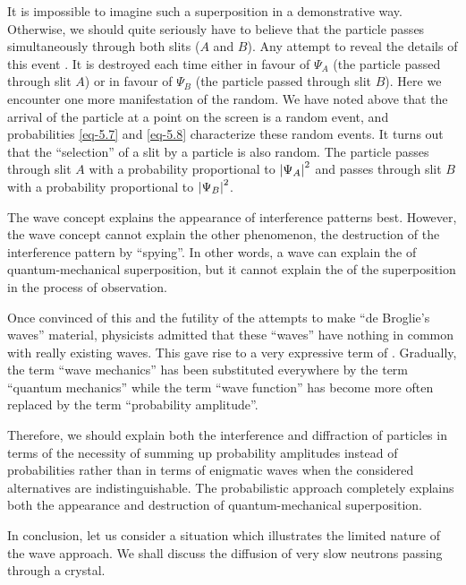 It is impossible to imagine such a superposition in a demonstrative
way. Otherwise, we should quite seriously have to believe that the
particle passes simultaneously through both slits ($A$ and $B$). Any attempt
to reveal the details of this event . It is
destroyed each time either in favour of $ \Psi_{A}$ (the particle passed through slit $A$) or in favour of $ \Psi_{B} $ (the particle passed through slit $B$). Here we encounter one more manifestation of the random. We have
noted above that the arrival of the particle at a point on the screen is
a random event, and probabilities \eqref{eq-5.7} and \eqref{eq-5.8} characterize these random events. It turns out that the ``selection'' of a slit by a particle is also random. The particle passes through slit $A$ with a probability proportional to  $ \abs{\Psi_{A}}^{2}$ and passes through slit $B$ with a probability proportional to $ \abs{\Psi_{B}}^{2}$.

 The wave concept
explains the appearance of interference patterns best. However, the wave
concept cannot explain the other phenomenon, the destruction of the
interference pattern by ``spying''. In other words, a wave can explain the
 of quantum-mechanical superposition, but it cannot explain the  of the superposition in the process of observation.

Once convinced of this and the futility of the attempts to make ``de
Broglie's waves'' material, physicists admitted that these ``waves'' have
nothing in common with really existing waves. This gave rise to a very
expressive term of . Gradually, the term ``wave
mechanics'' has been substituted everywhere by the term ``quantum
mechanics'' while the term ``wave function'' has become more often
replaced by the term ``probability amplitude''.

Therefore, we should explain both the interference and diffraction of
particles in terms of the necessity of summing up probability amplitudes
instead of probabilities rather than in terms of enigmatic waves when
the considered alternatives are indistinguishable. The probabilistic
approach completely explains both the appearance and destruction of
quantum-mechanical superposition.

In conclusion, let us consider a situation which illustrates the limited
nature of the wave approach. We shall discuss the diffusion of very slow
neutrons passing through a crystal.

